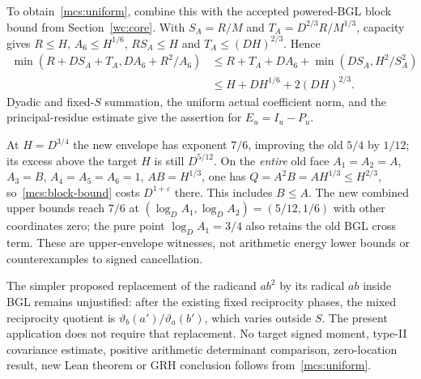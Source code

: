 To obtain~\eqref{mcs:uniform}, combine this with the accepted powered-BGL
block bound from Section~\ref{wc:core}. With
$S_A=R/M$ and $T_A=D^{2/3}R/M^{1/3}$, capacity gives
$R\le H$, $A_6\le H^{1/6}$, $RS_A\le H$ and
$T_A\le(DH)^{2/3}$. Hence
\begin{align*}
 \min(R+DS_A+T_A,DA_6+R^2/A_6)
 &\le R+T_A+DA_6+\min(DS_A,H^2/S_A^2)\\
 &\le H+DH^{1/6}+2(DH)^{2/3}.
\end{align*}
Dyadic and fixed-$S$ summation, the uniform actual coefficient norm,
and the principal-residue estimate give the assertion for $E_u=I_u-P_u$.

At $H=D^{3/4}$ the new envelope has exponent $7/6$, improving the old
$5/4$ by $1/12$; its excess above the target $H$ is still $D^{5/12}$.
On the \emph{entire} old face $A_1=A_2=A$, $A_3=B$,
$A_4=A_5=A_6=1$, $AB=H^{1/3}$, one has
$Q=A^2B=AH^{1/3}\le H^{2/3}$, so~\eqref{mcs:block-bound} costs
$D^{1+\varepsilon}$ there. This includes $B\le A$.
The new combined upper bounds reach $7/6$ at
$(\log_D A_1,\log_D A_2)=(5/12,1/6)$ with other coordinates zero;
the pure point $\log_D A_1=3/4$ also retains the old BGL cross term.
These are upper-envelope witnesses, not arithmetic energy lower bounds
or counterexamples to signed cancellation.

The simpler proposed replacement of the radicand $ab^2$ by its radical
$ab$ inside BGL remains unjustified: after the existing fixed reciprocity
phases, the mixed reciprocity quotient is
$\vartheta_b(a')/\vartheta_a(b')$, which varies outside $S$.
The present application does not require that replacement.
No target signed moment, type-II covariance estimate, positive arithmetic
determinant comparison, zero-location result, new Lean theorem or GRH
conclusion follows from~\eqref{mcs:uniform}.
